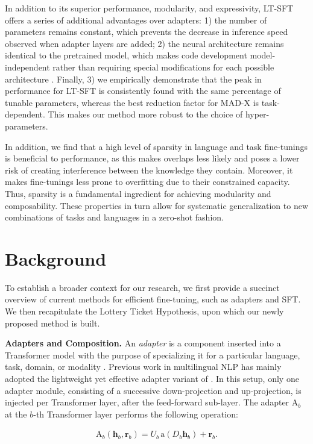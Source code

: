 In addition to its superior performance, modularity, and expressivity, LT-SFT offers a series of additional advantages over adapters: 1) the number of parameters remains constant, which prevents the decrease in inference speed observed when adapter layers are added; 2) the neural architecture remains identical to the pretrained model, which makes code development model-independent rather than requiring special modifications for each possible architecture \citep{pfeiffer-etal-2020-adapterhub}. Finally, 3) we empirically demonstrate that the peak in performance for LT-SFT is consistently found with the same percentage of tunable parameters, whereas the best reduction factor for MAD-X is task-dependent. This makes our method more robust to the choice of hyper-parameters.

In addition, we find that a high level of sparsity in language and task fine-tunings is beneficial to performance, as this makes overlaps less likely and poses a lower risk of creating interference between the knowledge they contain. Moreover, it makes fine-tunings less prone to overfitting due to their constrained capacity. Thus, sparsity is a fundamental ingredient for achieving modularity and composability. These properties in turn allow for systematic generalization to new combinations of tasks and languages in a zero-shot fashion.

\section{Background}
\label{sec:background}
To establish a broader context for our research, we first provide a succinct overview of current methods for efficient fine-tuning, such as adapters and SFT. We then recapitulate the Lottery Ticket Hypothesis, upon which our newly proposed method is built.

 \textbf{Adapters and Composition.} An \textit{adapter} is a component inserted into a Transformer model with the purpose of specializing it for a particular language, task, domain, or modality \cite{houlsby-etal-2019-parameter}. Previous work in multilingual NLP has mainly adopted the lightweight yet effective adapter variant of \citet{pfeiffer-etal-2021-adapterfusion}. In this setup, only one adapter module, consisting of a successive down-projection and up-projection, is injected per Transformer layer, after the feed-forward sub-layer. The adapter $\text{A}_b$ at the $b$-th Transformer layer performs the following operation:

\begin{align}
    \text{A}_b(\bm{h}_b, \bm{r}_b) = U_b \, \textrm{a}(D_b\bm{h}_b) + \bm{r}_b.
\end{align}


